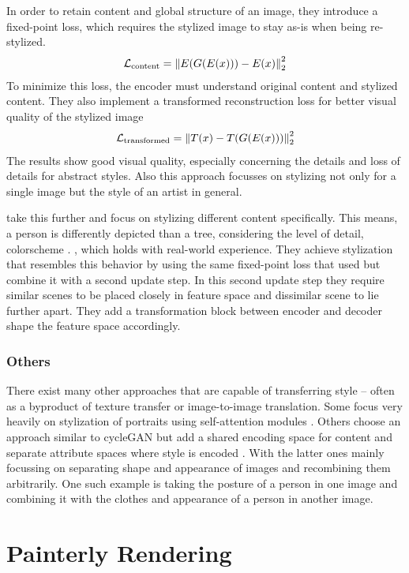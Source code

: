 In order to retain content and global structure of an image, they introduce a fixed-point loss, which requires the stylized image to stay as-is when being re-stylized.
\begin{align}
    \mathcal{L}_{\text{content}} = \left\lVert E(G(E(x))) - E(x)\right\rVert^2_2
\end{align}
To minimize this loss, the encoder must understand original content and stylized content.
They also implement a transformed reconstruction loss for better visual quality of the stylized image
\begin{align}
    \mathcal{L}_{\text{transformed}} = \left\lVert T(x) - T(G(E(x)))\right\rVert^2_2
\end{align}
The results show good visual quality, especially concerning the details and loss of details for abstract styles.
Also this approach focusses on stylizing not only for a single image but the style of an artist in general.

\citeauthor*{dima} take this further and focus on stylizing different content specifically.
This means, a person is differently depicted than a tree, considering the level of detail, colorscheme \etc. , which holds with real-world experience.
They achieve stylization that resembles this behavior by using the same fixed-point loss that \citeauthor*{artsiom} used but combine it with a second update step.
In this second update step they require similar scenes to be placed closely in feature space and dissimilar scene to lie further apart.
They add a transformation block between encoder and decoder shape the feature space accordingly.

\subsubsection{Others}
There exist many other approaches that are capable of transferring style -- often as a byproduct of texture transfer or image-to-image translation.
Some focus very heavily on stylization of portraits using self-attention modules \cite{ugatit}.
Others choose an approach similar to cycleGAN but add a shared encoding space for content and separate attribute spaces where style is encoded \cite{unit, munit, drit, drit++}.
With the latter ones mainly focussing on separating shape and appearance of images and recombining them arbitrarily.
One such example is taking the posture of a person in one image and combining it with the clothes and appearance of a person in another image.


\section{Painterly Rendering}

